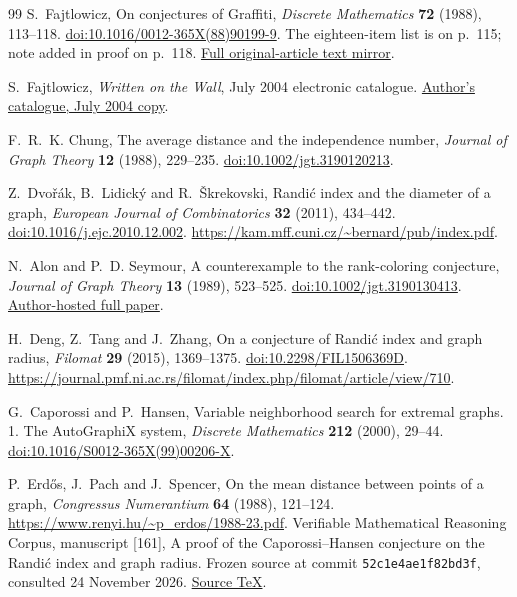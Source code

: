 \documentclass[11pt,a4paper]{article}
\theoremstyle{remark}\newtheorem{remark}[theorem]{Remark}
\newcommand{\doi}[1]{\href{https://doi.org/#1}{doi:#1}}
\begin{document}
\begin{thebibliography}{99}
S.~Fajtlowicz, On conjectures of Graffiti, \emph{Discrete Mathematics}
\textbf{72} (1988), 113--118. \doi{10.1016/0012-365X(88)90199-9}.
The eighteen-item list is on p.~115; note added in proof on p.~118.
\href{https://www.academia.edu/77817348/On_conjectures_of_Graffiti}{Full original-article text mirror}.

S.~Fajtlowicz, \emph{Written on the Wall}, July 2004 electronic catalogue.
\href{https://independencenumber.wordpress.com/wp-content/uploads/2012/08/wow-july2004.pdf}{Author's catalogue, July 2004 copy}.

F.~R.~K. Chung, The average distance and the independence number,
\emph{Journal of Graph Theory} \textbf{12} (1988), 229--235.
\doi{10.1002/jgt.3190120213}.

Z.~Dvo\v{r}\'ak, B.~Lidick\'y and R.~\v{S}krekovski,
Randi\'c index and the diameter of a graph,
\emph{European Journal of Combinatorics} \textbf{32} (2011), 434--442.
\doi{10.1016/j.ejc.2010.12.002}.
\url{https://kam.mff.cuni.cz/~bernard/pub/index.pdf}.

N.~Alon and P.~D. Seymour, A counterexample to the rank-coloring conjecture,
\emph{Journal of Graph Theory} \textbf{13} (1989), 523--525.
\doi{10.1002/jgt.3190130413}.
\href{https://web.math.princeton.edu/~nalon/PDFS/Publications/A\%20counter-example\%20to\%20the\%20rank-coloring\%20conjecture.pdf}{Author-hosted full paper}.

H.~Deng, Z.~Tang and J.~Zhang, On a conjecture of Randi\'c index and graph radius,
\emph{Filomat} \textbf{29} (2015), 1369--1375.
\doi{10.2298/FIL1506369D}.
\url{https://journal.pmf.ni.ac.rs/filomat/index.php/filomat/article/view/710}.

G.~Caporossi and P.~Hansen, Variable neighborhood search for extremal graphs.
1. The AutoGraphiX system, \emph{Discrete Mathematics}
\textbf{212} (2000), 29--44. \doi{10.1016/S0012-365X(99)00206-X}.

P.~Erd\H{o}s, J.~Pach and J.~Spencer, On the mean distance between points of a graph,
\emph{Congressus Numerantium} \textbf{64} (1988), 121--124.
\url{https://www.renyi.hu/~p_erdos/1988-23.pdf}.
Verifiable Mathematical Reasoning Corpus, manuscript [161], A proof of the Caporossi--Hansen conjecture on the Randi\'c index and graph radius.
Frozen source at commit \texttt{52c1e4ae1f82bd3f}, consulted 24 November 2026. \href{https://github.com/QEEDDD/Verifiable-Mathematical-Reasoning-Corpus/blob/52c1e4ae1f82bd3fdc8b809b9a94e2e4c6ef4cb3/\%5B161\%5D\%20Randic\_Index\_and\_Vertex\_Radius.tex}{Source TeX}.


\end{thebibliography}
\end{document}
